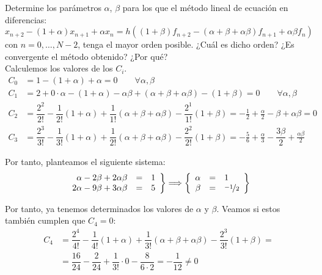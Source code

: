 \begin{ejercicio}\label{ej:3.1.12}
    Determine los parámetros $\alpha$, $\beta$ para los que el método lineal de ecuación en diferencias:
    \begin{equation*}
        x_{n+2} - (1 + \alpha) x_{n+1} + \alpha x_n = h ((1 + \beta) f_{n+2} - (\alpha + \beta + \alpha \beta) f_{n+1} + \alpha \beta f_n)
    \end{equation*}
    con $n = 0, \ldots, N-2$, tenga el mayor orden posible. ¿Cuál es dicho orden? ¿Es convergente el método obtenido? ¿Por qué?\\

    Calculemos los valores de los $C_i$.
    \begin{align*}
        C_0 &= 1-(1+\alpha) + \alpha = 0\qquad \forall \alpha,\beta\\
        C_1 &= 2 +0\cdot \alpha -(1+\alpha) - \alpha\beta + (\alpha+\beta+\alpha\beta) - (1+\beta) = 0\qquad \forall \alpha,\beta\\
        C_2 &= \dfrac{2^2}{2!} - \dfrac{1}{2!}(1+\alpha)+\dfrac{1}{1!}(\alpha+\beta+\alpha\beta) - \dfrac{2^1}{1!}(1+\beta)
        = -\frac{1}{2}+\frac{\alpha}{2}-\beta+\alpha\beta=0\\
        C_3 &= \dfrac{2^3}{3!} - \dfrac{1}{3!}(1+\alpha)+\dfrac{1}{2!}(\alpha+\beta+\alpha\beta) - \dfrac{2^2}{2!}(1+\beta)
        = -\frac{5}{6}+\frac{\alpha}{3}-\dfrac{3\beta}{2}+\frac{\alpha\beta}{2}
    \end{align*}

    Por tanto, planteamos el siguiente sistema:
    \begin{equation*}
        \left.
            \begin{array}{rcl}
                \alpha-2\beta+2\alpha\beta &=& 1\\
                2\alpha-9\beta+3\alpha\beta &=& 5
            \end{array}
        \right\}
        \Longrightarrow
        \left\{
            \begin{array}{rcl}
                \alpha &=& 1\\
                \beta &=& \nicefrac{-1}{2}
            \end{array}
        \right\}
    \end{equation*}

    Por tanto, ya tenemos determinados los valores de $\alpha$ y $\beta$. Veamos si estos también cumplen que $C_4=0$:
    \begin{align*}
        C_4 &= \dfrac{2^4}{4!} - \dfrac{1}{4!}(1+\alpha)+\dfrac{1}{3!}(\alpha+\beta+\alpha\beta) - \dfrac{2^3}{3!}(1+\beta)
        =\\&= \dfrac{16}{24}-\dfrac{2}{24} + \dfrac{1}{3!}\cdot 0 - \dfrac{8}{6\cdot 2}
        = -\dfrac{1}{12}\neq 0
    \end{align*}


\end{ejercicio}
